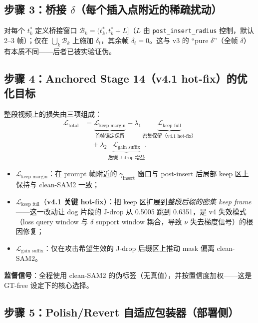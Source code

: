 \documentclass[11pt,a4paper]{ctexart}
\begin{document}
\subsection{步骤 3：桥接 $\delta$（每个插入点附近的稀疏扰动）}

对每个 $t^*_k$ 定义桥接窗口 $\mathcal{B}_k = (t^*_k, t^*_k + L]$（$L$ 由 \texttt{post\_insert\_radius} 控制，默认 2--3 帧）；仅在 $\bigcup_k \mathcal{B}_k$ 上施加 $\delta_t$，其余帧 $\delta_t = 0$。这与 v3 的 ``pure $\delta$''（全帧 $\delta$）有本质不同——后者已被实验证伪。

\subsection{步骤 4：Anchored Stage 14（v4.1 hot-fix）的优化目标}
\label{subsec:loss}

整段视频上的损失由三项组成：
\begin{align}
\mathcal{L}_{\text{total}} &=
   \underbrace{\mathcal{L}_{\text{keep margin}}}_{\text{首帧锚定保留}}
 + \lambda_1 \, \underbrace{\mathcal{L}_{\text{keep full}}}_{\text{密集保留（v4.1 hot-fix）}} \nonumber \\
 &\quad + \lambda_2 \, \underbrace{\mathcal{L}_{\text{gain suffix}}}_{\text{后缀 J-drop 增益}}.
\end{align}

\begin{itemize}[leftmargin=2em]
    \item $\mathcal{L}_{\text{keep margin}}$：在 prompt 帧附近的 $\gamma_{\text{insert}}$ 窗口与 post-insert 后局部 keep 区上保持与 clean-SAM2 一致；
    \item $\mathcal{L}_{\text{keep full}}$（\textbf{v4.1 关键 hot-fix}）：把 keep 区扩展到\emph{整段后缀的密集 keep frame}——这一改动让 dog 片段的 J-drop 从 0.5005 跳到 0.6351，是 v4 失效模式（loss query window 与 $\delta$ support window 耦合，导致 $\nu$ 失去梯度信号）的根因修复；
    \item $\mathcal{L}_{\text{gain suffix}}$：仅在攻击希望生效的 J-drop 后缀区上推动 mask 偏离 clean-SAM2。
\end{itemize}

\textbf{监督信号}：全程使用 clean-SAM2 的伪标签（无真值），并按置信度加权——这是 GT-free 设定下的核心选择。

\subsection{步骤 5：Polish/Revert 自适应包装器（部署侧）}
\end{document}
